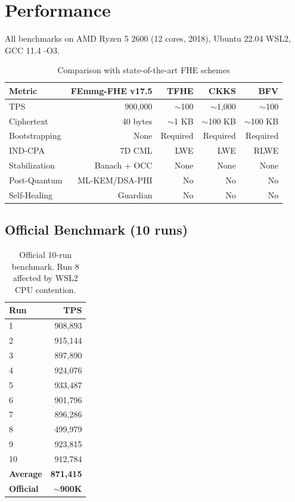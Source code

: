 \documentclass[11pt,a4paper]{article}
\begin{document}
\section{Performance}

All benchmarks on AMD Ryzen 5 2600 (12 cores, 2018), Ubuntu 22.04 WSL2, GCC 11.4 -O3.

\begin{table}[h]
\centering
\begin{tabular}{@{}lrrrr@{}}
\toprule
\textbf{Metric} & \textbf{FEmmg-FHE v17.5} & \textbf{TFHE} & \textbf{CKKS} & \textbf{BFV} \\
\midrule
TPS & 900,000 & $\sim$100 & $\sim$1,000 & $\sim$100 \\
Ciphertext & 40 bytes & $\sim$1 KB & $\sim$100 KB & $\sim$100 KB \\
Bootstrapping & None & Required & Required & Required \\
IND-CPA & 7D CML & LWE & LWE & RLWE \\
Stabilization & Banach + OCC & None & None & None \\
Post-Quantum & ML-KEM/DSA-PHI & No & No & No \\
Self-Healing & Guardian & No & No & No \\
\bottomrule
\end{tabular}
\caption{Comparison with state-of-the-art FHE schemes}
\end{table}

\subsection{Official Benchmark (10 runs)}

\begin{table}[h]
\centering
\begin{tabular}{@{}lr@{}}
\toprule
\textbf{Run} & \textbf{TPS} \\
\midrule
1 & 908,893 \\
2 & 915,144 \\
3 & 897,890 \\
4 & 924,076 \\
5 & 933,487 \\
6 & 901,796 \\
7 & 896,286 \\
8 & 499,979 \\
9 & 923,815 \\
10 & 912,784 \\
\midrule
\textbf{Average} & \textbf{871,415} \\
\textbf{Official} & \textbf{$\sim$900K} \\
\bottomrule
\end{tabular}
\caption{Official 10-run benchmark. Run 8 affected by WSL2 CPU contention.}
\end{table}
\end{document}
